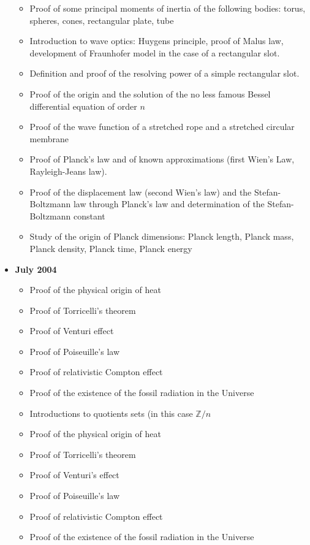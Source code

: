 \documentclass[12pt,a4paper,twoside,openright]{report}
\theoremstyle{definition}
\theoremstyle{itexmp}
\numberwithin{equation}{section}
\begin{document}
\begin{itemize}
\begin{itemize}[noitemsep]
				\item Proof of some principal moments of inertia of the following bodies: torus, spheres, cones, rectangular plate, tube
				\item Introduction to wave optics: Huygens principle, proof of Malus law, development of Fraunhofer model in the case of a rectangular slot. 
				\item Definition and proof of the resolving power of a simple rectangular slot.
				\item Proof of the origin and the solution of the no less famous Bessel differential equation of order $n$
				\item Proof of the wave function of a stretched rope and a stretched circular membrane
				\item Proof of Planck's law and of known approximations (first Wien's Law, Rayleigh-Jeans law).
				\item Proof of the displacement law (second Wien's law) and the Stefan-Boltzmann law through Planck's law and determination of the Stefan-Boltzmann constant
				\item Study of the origin of Planck dimensions: Planck length, Planck mass, Planck density, Planck time, Planck energy
			\end{itemize}
		\item \textbf{July 2004}
			\begin{itemize}[noitemsep]
				\item Proof of the physical origin of heat
				\item Proof of Torricelli's theorem
				\item Proof of Venturi effect
				\item Proof of Poiseuille's law
				\item Proof of relativistic Compton effect
				\item Proof of the existence of the fossil radiation in the Universe
				\item Introductions to quotients sets (in this case $\mathbb{Z}/n$
				\item Proof of the physical origin of heat
				\item Proof of Torricelli's theorem
				\item Proof of Venturi's effect
				\item Proof of Poiseuille's law
				\item Proof of relativistic Compton effect
				\item Proof of the existence of the fossil radiation in the Universe

\end{itemize}
\end{itemize}
\end{document}
